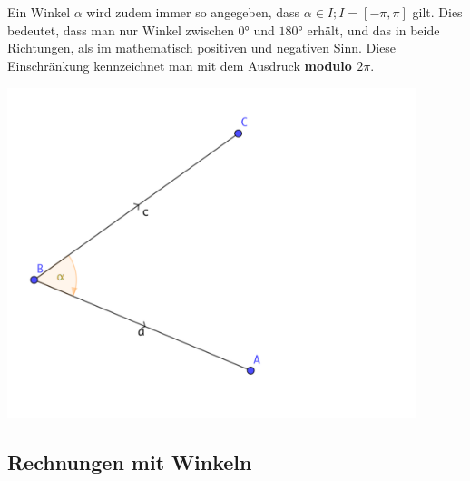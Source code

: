         \\
        \begin{minipage}{0.5\textwidth}\paragraph{} Ein Winkel $\alpha$ wird zudem immer so angegeben, dass $\alpha\in I; I = [-\pi,\pi]$ gilt. Dies bedeutet, dass man nur Winkel zwischen $0°$ und $180°$ erhält, und das in beide \glqq Richtungen\grqq, als im mathematisch positiven und negativen Sinn. Diese Einschränkung kennzeichnet man mit dem Ausdruck \glqq \textbf{modulo $2\pi$}\grqq.
        \end{minipage}
        \begin{minipage}{0.5\textwidth}
            \includegraphics[width=4.7in]{kap5/Orientierte_Winkel}
        \end{minipage}

    \subsection{Rechnungen mit Winkeln}

